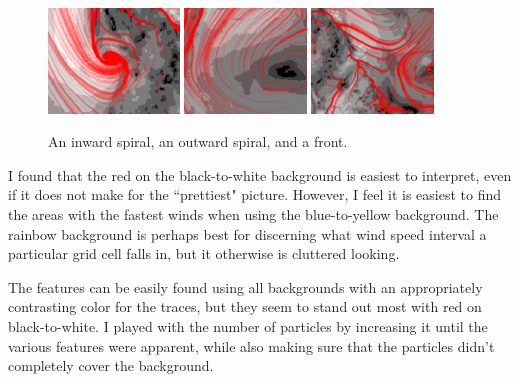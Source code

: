 \documentclass{article} %
\begin{document}
\begin{figure}[htb]
   \centering
   \includegraphics[height=1.1in]{images/inwardspiral.eps}
   \includegraphics[height=1.1in]{images/outwardspiral.eps}
   \includegraphics[height=1.1in]{images/front.eps}
    \caption{An inward spiral, an outward spiral, and a front.}
   \label{fig:features}
\end{figure}

I found that the red on the black-to-white background is easiest to interpret, even if it does not make for the ``prettiest" picture.  However, I feel it is easiest to find the areas with the fastest winds when using the blue-to-yellow background.  The rainbow background is perhaps best for discerning what wind speed interval a particular grid cell falls in, but it otherwise is cluttered looking.

The features can be easily found using all backgrounds with an appropriately contrasting color for the traces, but they seem to stand out most with red on black-to-white.  I played with the number of particles by increasing it until the various features were apparent, while also making sure that the particles didn't completely cover the background. 
\end{document}

